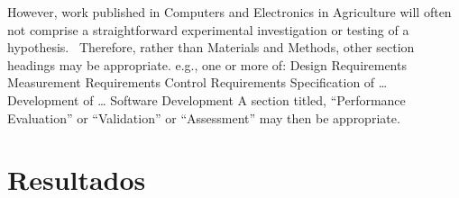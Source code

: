 \documentclass[10pt,authoryear]{elsarticle}
\begin{document}
{		{\color{black}
			However, work published in Computers and Electronics in Agriculture will often not comprise a straightforward
			experimental investigation or testing of a hypothesis. \ Therefore, rather than Materials and Methods, other section
			headings may be appropriate.\newline
			e.g., one or more of:\newline
			Design Requirements\newline
			Measurement Requirements\newline
			Control Requirements\newline
			Specification of …\newline
			Development of …\newline
			Software Development\newline
			A section titled, “Performance Evaluation” or “Validation” or “Assessment” may then be appropriate.}
		\fi
		
		\bigskip
		
		\newpage
		\section{Resultados}
		
		

		
}
\end{document}
